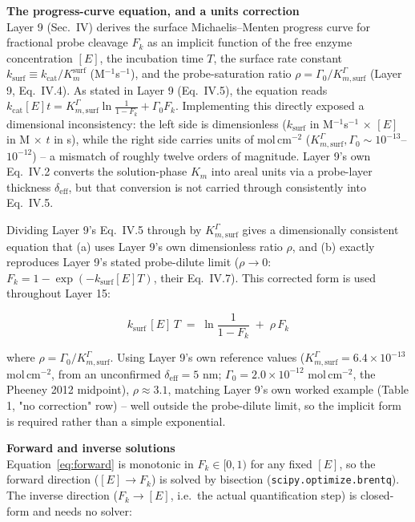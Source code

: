 \documentclass[11pt]{article}
\numberwithin{equation}{section}
\newcommand{\subhead}[1]{\vspace{0.6em}\noindent\textbf{#1}\vspace{0.2em}\\}
\newcommand{\code}[1]{\texttt{#1}}
\begin{document}
\subhead{The progress-curve equation, and a units correction}
Layer 9 (Sec.\ IV) derives the surface Michaelis--Menten progress curve for fractional probe cleavage $F_k$
as an implicit function of the free enzyme concentration $[E]$, the incubation time $T$, the surface rate
constant $k_{\mathrm{surf}}\equiv k_{\mathrm{cat}}/K_m^{\mathrm{surf}}$ (M$^{-1}$s$^{-1}$), and the
probe-saturation ratio $\rho = \Gamma_0/K_{m,\mathrm{surf}}^{\Gamma}$ (Layer 9, Eq.\ IV.4). As stated in Layer
9 (Eq.\ IV.5), the equation reads $k_{\mathrm{cat}}[E]t = K_{m,\mathrm{surf}}^{\Gamma}\ln\!\frac{1}{1-F_k} +
\Gamma_0 F_k$. Implementing this directly exposed a dimensional inconsistency: the left side is dimensionless
($k_{\mathrm{surf}}$ in M$^{-1}$s$^{-1}$ $\times$ $[E]$ in M $\times$ $t$ in s), while the right side carries
units of mol\,cm$^{-2}$ ($K_{m,\mathrm{surf}}^{\Gamma},\Gamma_0\sim10^{-13}$--$10^{-12}$) -- a mismatch of
roughly twelve orders of magnitude. Layer 9's own Eq.\ IV.2 converts the solution-phase $K_m$ into areal units
via a probe-layer thickness $\delta_{\mathrm{eff}}$, but that conversion is not carried through consistently
into Eq.\ IV.5.

Dividing Layer 9's Eq.\ IV.5 through by $K_{m,\mathrm{surf}}^{\Gamma}$ gives a dimensionally consistent
equation that (a) uses Layer 9's own dimensionless ratio $\rho$, and (b) exactly reproduces Layer 9's stated
probe-dilute limit ($\rho\to0$: $F_k = 1-\exp(-k_{\mathrm{surf}}[E]T)$, their Eq.\ IV.7). This corrected form
is used throughout Layer 15:

\begin{keybox}
\begin{equation}
k_{\mathrm{surf}}\,[E]\,T \;=\; \ln\!\frac{1}{1-F_k} \;+\; \rho\,F_k
\label{eq:forward}
\end{equation}
\end{keybox}

\noindent where $\rho = \Gamma_0/K_{m,\mathrm{surf}}^{\Gamma}$. Using Layer 9's own reference values
($K_{m,\mathrm{surf}}^{\Gamma}=6.4\times10^{-13}$ mol\,cm$^{-2}$, from an unconfirmed $\delta_{\mathrm{eff}}=5$
nm; $\Gamma_0 = 2.0\times10^{-12}$ mol\,cm$^{-2}$, the Pheeney 2012 midpoint), $\rho \approx 3.1$, matching
Layer 9's own worked example (Table 1, "no correction" row) -- well outside the probe-dilute limit, so the
implicit form is required rather than a simple exponential.

\subhead{Forward and inverse solutions}
Equation~\ref{eq:forward} is monotonic in $F_k\in[0,1)$ for any fixed $[E]$, so the forward direction
($[E]\to F_k$) is solved by bisection (\code{scipy.optimize.brentq}). The inverse direction ($F_k\to[E]$,
i.e.\ the actual quantification step) is closed-form and needs no solver:
\end{document}
